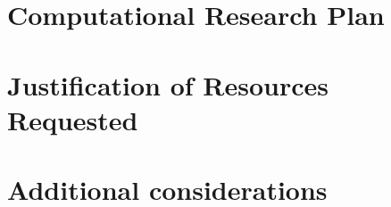\documentclass[a4paper, 11pt, notitlepage]{nsf}
\begin{document}
\section{Computational Research Plan}
\label{sec:research_plan}


\section{Justification of Resources Requested}


\section{Additional considerations}


%
\newpage


\end{document}
